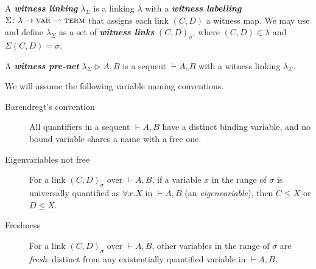 \documentclass[UKenglish]{lipics-v2016}
\theoremstyle{plain}
\newcommand\defn[1]{\textit{\textbf{#1}}}
\newcommand\var{\textsc{var}}
\newcommand\terms{\textsc{term}}
\newcommand\+{+}
\renewcommand\*{\times}
\newcommand\seq[2]{{\vdash}#1,#2}
\newcommand\net[3]{#1\triangleright #2,#3}
\newcommand\link[3][\sigma]{(#2,#3)_{#1}}
\begin{document}
A \defn{witness linking} $\lambda_\Sigma$ is a linking $\lambda$ with a \defn{witness labelling} $\Sigma\colon\lambda\to\var\rightharpoonup\terms$ that assigns each link $(C,D)$ a witness map. We may use and define $\lambda_\Sigma$ as a set of \defn{witness links} $\link CD$, where $(C,D)\in\lambda$ and $\Sigma(C,D)=\sigma$.


\begin{definition}
A \defn{witness pre-net} $\net{\lambda_\Sigma}AB$ is a sequent $\seq AB$ with a witness linking $\lambda_\Sigma$.
\end{definition}


We will assume the following variable naming conventions.
%
\begin{description}
	\item
[Barendregt's convention] All quantifiers in a sequent $\seq AB$ have a distinct binding variable, and no bound variable shares a name with a free one.

	\item[Eigenvariables not free]
For a link $\link CD$ over $\seq AB$, if a variable $x$ in the range of $\sigma$ is universally quantified as $\forall x.X$ in $\seq AB$ (an \emph{eigenvariable}), then $C\leq X$ or $D\leq X$.

	\item[Freshness]
For a link $\link CD$ over $\seq AB$, other variables in the range of $\sigma$ are \emph{fresh}: distinct from any existentially quantified variable in $\seq AB$.
\end{description}

\end{document}
